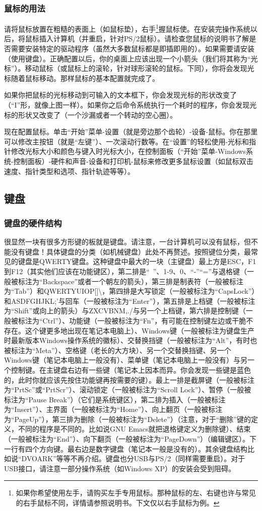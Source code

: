 \subsubsection{鼠标的用法}
请将鼠标放置在粗糙的表面上（如鼠标垫），右手\footnote{如果你希望使用左手，请购买左手专用鼠标。那种鼠标的左、右键也许与常见的右手鼠标不同，详情请参照说明书。下文仅以右手鼠标为例。}握鼠标使。在安装完操作系统以后，将鼠标插入计算机（并重启，针对PS/2鼠标）。请检查您鼠标的说明书了解是否需要安装特定的驱动程序（虽然大多数鼠标都是即插即用的）。如果需要请安装（使用键盘）。正确配置以后，你的桌面上应该出现一个小箭头（我们将其称为“光标”）。移动鼠标（或鼠标上的滚轮，针对球形滚轮的鼠标。下同），你将会发现光标随着鼠标移动。那样鼠标的基本配置就完成了。\par
如果你把鼠标的光标移动到可输入的文本框下，你会发现光标的形状改变了（“I”形，就像上图一样）。如果你之后命令系统执行一个耗时的程序，你会发现光标的形状又改变了（一个沙漏或者一个转动的空心圈）。\par
现在配置鼠标。单击“开始”菜单-设置（就是旁边那个齿轮）-设备-鼠标。你在那里可以修改主按钮（就是“左键”）、一次滚动行数等。在“设置”的轻松使用-光标和指针修改光标大小和颜色与键入时光标大小，在控制面板（“开始”菜单-Windows系统-控制面板）-硬件和声音-设备和打印机-鼠标来修改更多鼠标设置（如鼠标双击速度、指针类型和选项、指针轨迹等等）。
\subsection{键盘}
\subsubsection{键盘的硬件结构}
很显然一块有很多方形键的板就是键盘。请注意，一台计算机可以没有鼠标，但不能没有键盘！具体键盘的分类（如机械键盘）此处不再赘述。按照键位分类，最常见的键盘是QWERTY键盘。这种键盘中最大的一块（主键盘）最上方是ESC，F1到F12（其实他们应该在功能键区），第二排是“~”、1-9、0、“-”“=”与退格键（一般被标注为“Backspace”或者一个朝左的箭头），第三排是制表符（一般被标注为“Tab”）和QWERTYUIOP[]\textbackslash，第四排是大写锁定（一般被标注为“CapsLock”）和ASDFGHJKL;'与回车（一般被标注为“Enter”），第五排是上档键（一般被标注为“Shift”或向上的箭头）与ZXCVBNM,./与另一个上档键，第六排是控制键（一般被标注为“Ctrl”）、功能键（一般被标注为“Fn”，有可能在控制键左边或干脆不存在。这个键更多地出现在笔记本电脑上）、Windows键（一般被标注为键盘生产时最新版本Windows操作系统的徽标）、交替换挡键（一般被标注为“Alt”，有时也被标注为“Meta”）、空格键（老长的大方块）、另一个交替换挡键、另一个Windows键（笔记本电脑上一般没有）、菜单键（笔记本电脑上一般没有）与另一个控制键。在主键盘右边有一些键（笔记本上因本而异。你会发现一些键是蓝色的，此时你就应该先按住功能键再按需要的键）。最上一排是截屏键（一般被标注为“PrtSc”或“PrtScr”）、滚动锁定（一般被标注为“Scroll Lock”）、暂停（一般被标注为“Pause Break”）（它们是系统键区），第二排为插入（一般被标注为“Insert”）、主界面（一般被标注为“Home”）、向上翻页（一般被标注为“PageUp”），第三排为删除（一般被标注为“Delete”）（注意，对于“删除”键的定义，不同的程序是不同的。比如说GNU Emacs就把退格键定义为删除键）、结束（一般被标注为“End”）、向下翻页（一般被标注为“PageDown”）（编辑键区）。下一行有四个方向键。最右边是数字键盘（笔记本一般是没有的）。其余键盘结构比如说“DVOARK”等等不再介绍。键盘也分USB与PS/2（同样需要重启）。对于USB接口，请注意一部分操作系统（如Windows XP）的安装会受到阻碍。
